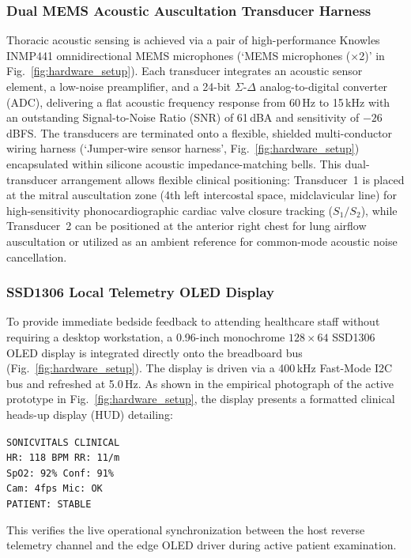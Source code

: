 \documentclass[journal]{IEEEtran}
\begin{document}
\subsubsection{Dual MEMS Acoustic Auscultation Transducer Harness}
Thoracic acoustic sensing is achieved via a pair of high-performance Knowles INMP441 omnidirectional MEMS microphones (`MEMS microphones ($\times$2)' in Fig.~\ref{fig:hardware_setup}). Each transducer integrates an acoustic sensor element, a low-noise preamplifier, and a 24-bit $\Sigma$-$\Delta$ analog-to-digital converter (ADC), delivering a flat acoustic frequency response from 60\,Hz to 15\,kHz with an outstanding Signal-to-Noise Ratio (SNR) of 61\,dBA and sensitivity of $-26$\,dBFS. The transducers are terminated onto a flexible, shielded multi-conductor wiring harness (`Jumper-wire sensor harness', Fig.~\ref{fig:hardware_setup}) encapsulated within silicone acoustic impedance-matching bells. This dual-transducer arrangement allows flexible clinical positioning: Transducer~1 is placed at the mitral auscultation zone (4th left intercostal space, midclavicular line) for high-sensitivity phonocardiographic cardiac valve closure tracking ($S_1/S_2$), while Transducer~2 can be positioned at the anterior right chest for lung airflow auscultation or utilized as an ambient reference for common-mode acoustic noise cancellation.

\subsubsection{SSD1306 Local Telemetry OLED Display}
To provide immediate bedside feedback to attending healthcare staff without requiring a desktop workstation, a 0.96-inch monochrome $128 \times 64$ SSD1306 OLED display is integrated directly onto the breadboard bus (Fig.~\ref{fig:hardware_setup}). The display is driven via a 400\,kHz Fast-Mode I2C bus and refreshed at 5.0\,Hz. As shown in the empirical photograph of the active prototype in Fig.~\ref{fig:hardware_setup}, the display presents a formatted clinical heads-up display (HUD) detailing:
\begin{center}
\texttt{SONICVITALS CLINICAL} \\
\texttt{HR: 118 BPM  RR: 11/m} \\
\texttt{SpO2: 92\%  Conf: 91\%} \\
\texttt{Cam: 4fps   Mic: OK} \\
\texttt{PATIENT: STABLE}
\end{center}
This verifies the live operational synchronization between the host reverse telemetry channel and the edge OLED driver during active patient examination.
\end{document}

